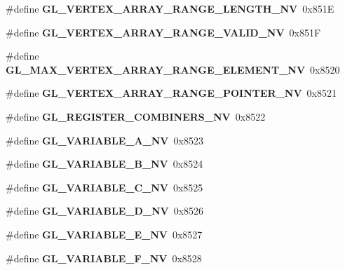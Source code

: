 \begin{DoxyCompactItemize}
\item 
\#define {\bfseries G\+L\+\_\+\+V\+E\+R\+T\+E\+X\+\_\+\+A\+R\+R\+A\+Y\+\_\+\+R\+A\+N\+G\+E\+\_\+\+L\+E\+N\+G\+T\+H\+\_\+\+N\+V}~0x851\+E\label{_s_d_l__opengl_8h_ac210b6b71c50ef8f5c79880d1ec28ee9}

\item 
\#define {\bfseries G\+L\+\_\+\+V\+E\+R\+T\+E\+X\+\_\+\+A\+R\+R\+A\+Y\+\_\+\+R\+A\+N\+G\+E\+\_\+\+V\+A\+L\+I\+D\+\_\+\+N\+V}~0x851\+F\label{_s_d_l__opengl_8h_acc9f0bad7dbb4e72c14dd63196c756f9}

\item 
\#define {\bfseries G\+L\+\_\+\+M\+A\+X\+\_\+\+V\+E\+R\+T\+E\+X\+\_\+\+A\+R\+R\+A\+Y\+\_\+\+R\+A\+N\+G\+E\+\_\+\+E\+L\+E\+M\+E\+N\+T\+\_\+\+N\+V}~0x8520\label{_s_d_l__opengl_8h_ae2552e0558b8c06d5aa10cda68945f13}

\item 
\#define {\bfseries G\+L\+\_\+\+V\+E\+R\+T\+E\+X\+\_\+\+A\+R\+R\+A\+Y\+\_\+\+R\+A\+N\+G\+E\+\_\+\+P\+O\+I\+N\+T\+E\+R\+\_\+\+N\+V}~0x8521\label{_s_d_l__opengl_8h_a780ba6dfb986c8b7b77b4d34138f3fe2}

\item 
\#define {\bfseries G\+L\+\_\+\+R\+E\+G\+I\+S\+T\+E\+R\+\_\+\+C\+O\+M\+B\+I\+N\+E\+R\+S\+\_\+\+N\+V}~0x8522\label{_s_d_l__opengl_8h_a6b0ab5ec0f5327b8629657906908e3d5}

\item 
\#define {\bfseries G\+L\+\_\+\+V\+A\+R\+I\+A\+B\+L\+E\+\_\+\+A\+\_\+\+N\+V}~0x8523\label{_s_d_l__opengl_8h_ae8c75a16d2f29930b3121b3f70d95c9b}

\item 
\#define {\bfseries G\+L\+\_\+\+V\+A\+R\+I\+A\+B\+L\+E\+\_\+\+B\+\_\+\+N\+V}~0x8524\label{_s_d_l__opengl_8h_a321d01491b1019d5d361322e2952a740}

\item 
\#define {\bfseries G\+L\+\_\+\+V\+A\+R\+I\+A\+B\+L\+E\+\_\+\+C\+\_\+\+N\+V}~0x8525\label{_s_d_l__opengl_8h_a6a30897c9b2c3ed36d990b5977d37bfc}

\item 
\#define {\bfseries G\+L\+\_\+\+V\+A\+R\+I\+A\+B\+L\+E\+\_\+\+D\+\_\+\+N\+V}~0x8526\label{_s_d_l__opengl_8h_a2d2ce31e463d010642e1311cbdec60c3}

\item 
\#define {\bfseries G\+L\+\_\+\+V\+A\+R\+I\+A\+B\+L\+E\+\_\+\+E\+\_\+\+N\+V}~0x8527\label{_s_d_l__opengl_8h_a7c5cc7793e6708a28828760af707bcea}

\item 
\#define {\bfseries G\+L\+\_\+\+V\+A\+R\+I\+A\+B\+L\+E\+\_\+\+F\+\_\+\+N\+V}~0x8528\label{_s_d_l__opengl_8h_ab8403e4070fbf878521bbd2fc4a3cf6e}


\end{DoxyCompactItemize}
